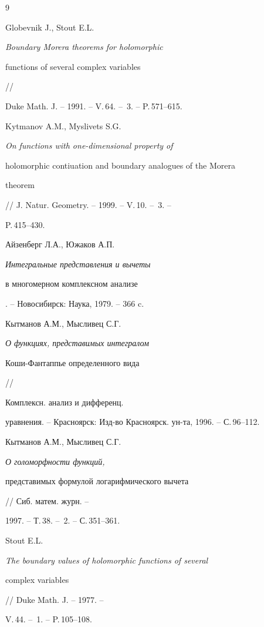 \begin{thebibliography}{9}







Globevnik J., Stout E.L. {\em Boundary Morera theorems for holomorphic


functions of several complex variables} //


Duke Math. J. -- 1991. -- V.\,64. -- \No\,3. -- P.\,571--615.




Kytmanov A.M., Myslivets S.G.


{\em On functions with one-dimensional property of


holomorphic contiuation and boundary analogues of the Morera


theorem} // J. Natur. Geometry. -- 1999. -- V.\,10. -- \No\,3. --


P.\,415--430.




Айзенберг Л.А., Южаков А.П. {\em Интегральные представления и вычеты


в многомерном комплексном анализе}. -- Новосибирск: Наука, 1979. -- 366 c.




Кытманов А.М., Мысливец С.Г. {\em О функциях, представимых интегралом


Коши-Фантаппье определенного вида} //


Комплексн. анализ и дифференц.


уравнения. -- Красноярск: Изд-во Красноярск. ун-та, 1996. -- С.\,96--112.




Кытманов А.М., Мысливец С.Г. {\em О голоморфности функций,


представимых формулой логарифмического вычета} // Сиб. матем. журн. --


1997. -- Т.\,38. -- \No\,2. -- С.\,351--361.




Stout E.L. {\em The boundary values of holomorphic functions of several


complex variables} // Duke Math. J. -- 1977. --


V.\,44. -- \No\,1. -- P.\,105--108.





\end{thebibliography}





\vskip 0.5cm












\label{end}





